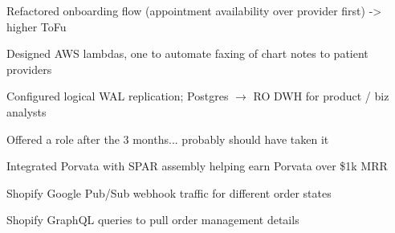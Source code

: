 \documentclass[]{deedy-resume}
\begin{document}
\begin{minipage}[t]{0.66\textwidth}
\begin{tightitemize}
    \item Refactored onboarding flow (appointment availability over provider first) -> higher ToFu
    \item Designed AWS lambdas, one to automate faxing of chart notes to patient providers
    \item Configured logical WAL replication; Postgres $\rightarrow$ RO DWH for product / biz analysts
    \item Offered a role after the 3 months... probably should have taken it
\end{tightitemize}
\sectionspace

\begin{tightitemize}
\item Integrated Porvata with SPAR assembly helping earn Porvata over \$1k MRR
\item Shopify Google Pub/Sub webhook traffic for different order states
\item Shopify GraphQL queries to pull order management details
\end{tightitemize}
\sectionspace


\end{minipage}
\end{document}
